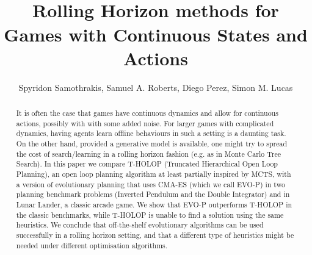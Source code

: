 \documentclass[conference]{IEEEtran}
\begin{document}
\title{\ \\ \LARGE\bf Rolling Horizon methods for Games with Continuous States and Actions } 

\author{Spyridon Samothrakis, Samuel A. Roberts, Diego Perez, Simon M. Lucas}


\maketitle


\begin{abstract}
It is often the case that games have continuous dynamics and allow for continuous actions, possibly with with some added noise. For larger games with complicated dynamics, having agents learn offline behaviours in such a setting is a daunting task. On the other hand, provided a generative model is available, one might try to spread the cost of search/learning in a rolling horizon fashion (e.g. as in Monte Carlo Tree Search). In this paper we compare T-HOLOP (Truncated Hierarchical Open Loop Planning), an open loop planning algorithm at least partially inspired by MCTS, with a version of evolutionary planning that uses CMA-ES (which we call EVO-P) in two planning benchmark problems (Inverted Pendulum and the Double Integrator) and in Lunar Lander, a classic arcade game. We show that EVO-P outperforms T-HOLOP in the classic benchmarks, while T-HOLOP is unable to find a solution using the same heuristics. We conclude that off-the-shelf evolutionary algorithms can be used successfully in a rolling horizon setting, and that a different type of heuristics might be needed under different optimisation algorithms. 

\end{abstract}

\end{document}

